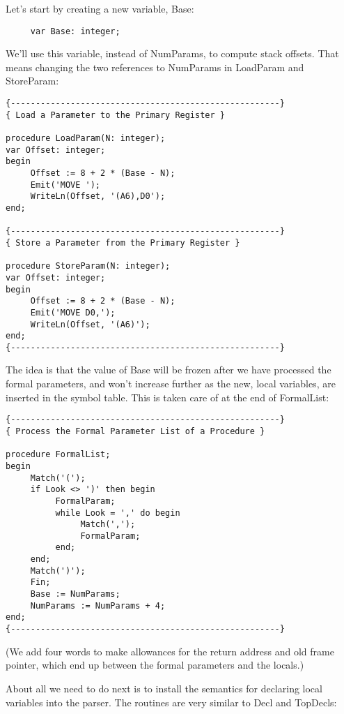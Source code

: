 Let's start by creating a new variable, Base:

\begin{verbatim}
     var Base: integer;
\end{verbatim}

We'll use this  variable, instead of NumParams, to compute stack offsets. That means changing  the two references to NumParams in LoadParam and StoreParam:

\begin{verbatim}
{------------------------------------------------------}
{ Load a Parameter to the Primary Register }

procedure LoadParam(N: integer);
var Offset: integer;
begin
     Offset := 8 + 2 * (Base - N);
     Emit('MOVE ');
     WriteLn(Offset, '(A6),D0');
end;

{------------------------------------------------------}
{ Store a Parameter from the Primary Register }

procedure StoreParam(N: integer);
var Offset: integer;
begin
     Offset := 8 + 2 * (Base - N);
     Emit('MOVE D0,');
     WriteLn(Offset, '(A6)');
end;
{------------------------------------------------------}
\end{verbatim}

The idea is that the value of Base will be  frozen  after we have processed the formal parameters, and  won't  increase  further as the new, local variables, are inserted in the symbol table. This is taken care of at the end of FormalList:

\begin{verbatim}
{------------------------------------------------------}
{ Process the Formal Parameter List of a Procedure }

procedure FormalList;
begin
     Match('(');
     if Look <> ')' then begin
          FormalParam;
          while Look = ',' do begin
               Match(',');
               FormalParam;
          end;
     end;
     Match(')');
     Fin;
     Base := NumParams;
     NumParams := NumParams + 4;
end;
{------------------------------------------------------}
\end{verbatim}

(We add four words to make allowances for the return  address and old frame pointer, which end up between the formal parameters and the locals.)

About all we  need  to  do  next  is to install the semantics for declaring local variables into the parser. The routines are very similar to Decl and TopDecls:

